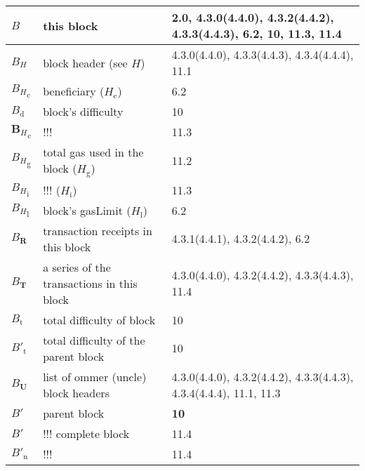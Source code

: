 \documentclass[9pt,oneside]{amsart}
\newcommand{\reff}[1]{{\footnotesize #1}}
\begin{document}
\begin{longtabu}{X[1.2lm] X[3] X}
$B$ &
this block &
\reff{2.0, 4.3.0(4.4.0), 4.3.2(4.4.2), 4.3.3(4.4.3), 6.2, 10, 11.3, 11.4} \\\hline

$B_{H}$ &
block header (see $H$) &
\reff{4.3.0(4.4.0), 4.3.3(4.4.3), 4.3.4(4.4.4), 11.1} \\\hline

${B_{H}}_{\mathrm{c}}$ &
beneficiary ($H_{\mathrm{c}}$) &
\reff{6.2} \\\hline

$B_{\mathrm{d}}$ &
block's difficulty &
\reff{10} \\\hline

${\mathbf{B}_{H}}_{\mathrm{c}}$ &
!!! &
\reff{11.3} \\\hline

${B_{H}}_{\mathrm{g}}$ &
total gas used in the block ($H_{\mathrm{g}}$) &
\reff{11.2} \\\hline

${B_{H}}_{\mathrm{i}}$ &
!!! ($H_{\mathrm{i}}$) &
\reff{11.3} \\\hline

${B_{H}}_{\mathrm{l}}$ &
block's gasLimit ($H_{\mathrm{l}}$) &
\reff{6.2} \\\hline

$B_{\mathbf{R}}$ &
transaction receipts in this block &
\reff{4.3.1(4.4.1), 4.3.2(4.4.2), 6.2} \\\hline

$B_{\mathbf{T}}$ &
a series of the transactions in this block &
\reff{4.3.0(4.4.0), 4.3.2(4.4.2), 4.3.3(4.4.3), 11.4} \\\hline

$B_{\mathrm{t}}$ &
total difficulty of block &
\reff{10} \\\hline

$B'_{\mathrm{t}}$ &
total difficulty of the parent block &
\reff{10} \\\hline

$B_{\mathbf{U}}$ &
list of ommer (uncle) block headers &
\reff{4.3.0(4.4.0), 4.3.2(4.4.2), 4.3.3(4.4.3), 4.3.4(4.4.4), 11.1, 11.3} \\\hline

$B'$ &
parent block &
\reff{\textbf{10}} \\\hline

$B'$ &
!!! complete block &
\reff{11.4} \\\hline

$B'_{\mathrm{n}}$ &
!!! &
\reff{11.4} \\\hline


\end{longtabu}
\end{document}
